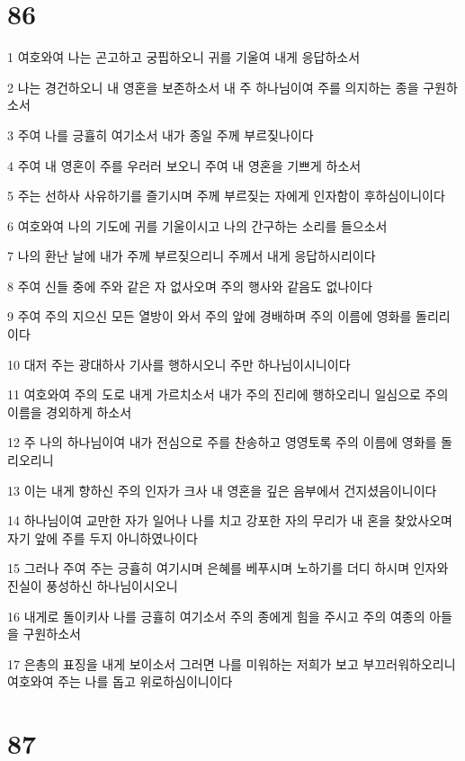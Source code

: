 \chapter{86}

\par 1 여호와여 나는 곤고하고 궁핍하오니 귀를 기울여 내게 응답하소서
\par 2 나는 경건하오니 내 영혼을 보존하소서 내 주 하나님이여 주를 의지하는 종을 구원하소서
\par 3 주여 나를 긍휼히 여기소서 내가 종일 주께 부르짖나이다
\par 4 주여 내 영혼이 주를 우러러 보오니 주여 내 영혼을 기쁘게 하소서
\par 5 주는 선하사 사유하기를 즐기시며 주께 부르짖는 자에게 인자함이 후하심이니이다
\par 6 여호와여 나의 기도에 귀를 기울이시고 나의 간구하는 소리를 들으소서
\par 7 나의 환난 날에 내가 주께 부르짖으리니 주께서 내게 응답하시리이다
\par 8 주여 신들 중에 주와 같은 자 없사오며 주의 행사와 같음도 없나이다
\par 9 주여 주의 지으신 모든 열방이 와서 주의 앞에 경배하며 주의 이름에 영화를 돌리리이다
\par 10 대저 주는 광대하사 기사를 행하시오니 주만 하나님이시니이다
\par 11 여호와여 주의 도로 내게 가르치소서 내가 주의 진리에 행하오리니 일심으로 주의 이름을 경외하게 하소서
\par 12 주 나의 하나님이여 내가 전심으로 주를 찬송하고 영영토록 주의 이름에 영화를 돌리오리니
\par 13 이는 내게 향하신 주의 인자가 크사 내 영혼을 깊은 음부에서 건지셨음이니이다
\par 14 하나님이여 교만한 자가 일어나 나를 치고 강포한 자의 무리가 내 혼을 찾았사오며 자기 앞에 주를 두지 아니하였나이다
\par 15 그러나 주여 주는 긍휼히 여기시며 은혜를 베푸시며 노하기를 더디 하시며 인자와 진실이 풍성하신 하나님이시오니
\par 16 내게로 돌이키사 나를 긍휼히 여기소서 주의 종에게 힘을 주시고 주의 여종의 아들을 구원하소서
\par 17 은총의 표징을 내게 보이소서 그러면 나를 미워하는 저희가 보고 부끄러워하오리니 여호와여 주는 나를 돕고 위로하심이니이다

\chapter{87}


